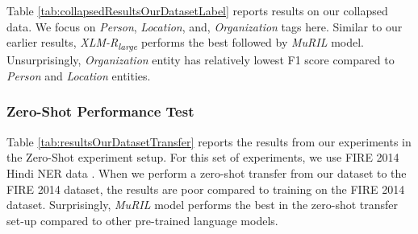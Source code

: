 \documentclass[10pt, a4paper]{article}
\begin{document}
Table \ref{tab:collapsedResultsOurDatasetLabel} reports results on our collapsed data. We focus on \textit{Person}, \textit{Location}, and, \textit{Organization} tags here. Similar to our earlier results, \textit{XLM-R\textsubscript{large}} performs the best followed by \textit{MuRIL} model. Unsurprisingly, \textit{Organization} entity has relatively lowest F1 score compared to \textit{Person} and \textit{Location} entities.

\subsubsection*{Zero-Shot Performance Test}

Table \ref{tab:resultsOurDatasetTransfer} reports the results from our experiments in the Zero-Shot experiment setup. For this set of experiments, we use FIRE 2014 Hindi NER data \cite{FIRE2014}. When we perform a zero-shot transfer from our dataset to the FIRE 2014 dataset, the results are poor compared to training on the FIRE 2014 dataset. Surprisingly, \textit{MuRIL} model performs the best in the zero-shot transfer set-up compared to other pre-trained language models. 

\begin{table}[!t]
\centering
{}
\caption{Test Set Micro F1-Score of various pre-trained LMs on both datasets where HiNER (collapsed) is our dataset with only the \textit{Person}, \textit{Location} and \textit{Organization} tags. This table reports a mean F1-score and its standard deviation over 5 runs.}
\label{tab:resultsOurDatasetTransfer}
\end{table}
\end{document}
